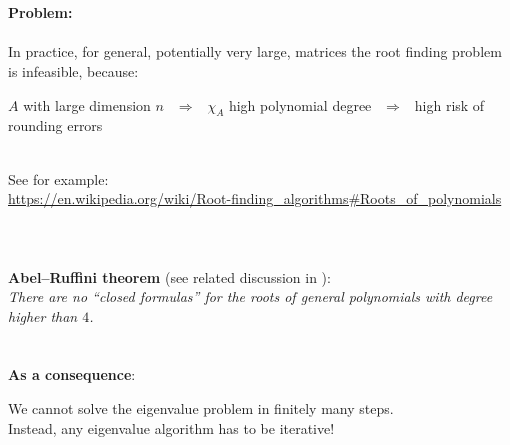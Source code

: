 \begin{frame}

	~\\~\\
	\textbf{Problem:}\\~\\
	In practice, for general, potentially very large, matrices the root finding problem is infeasible, because: \\
	\begin{center}
		$A$ with large dimension $n$ $~~\Rightarrow~~$ $\chi_A$ high polynomial degree $~~\Rightarrow~~$ high risk of rounding errors
	\end{center}
	~\\
	{\footnotesize See for example:\\
	\url{https://en.wikipedia.org/wiki/Root-finding_algorithms\#Roots\_of\_polynomials}
	}
	~\\
	~\\~\\
	\textbf{Abel–Ruffini theorem} (see related discussion in \cite[Theorem 25.1]{TreBau}):\\ \textit{There are no ``closed formulas'' for the roots of general polynomials with degree higher than $4$.}
	~\\~\\~\\
	\textbf{As a consequence}: \begin{center}
		We cannot solve the eigenvalue problem in finitely many steps.\\ Instead, any eigenvalue algorithm has to be iterative!
	\end{center}
	\end{frame}



